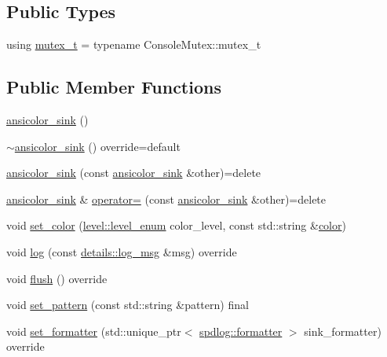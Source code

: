 \subsection*{Public Types}
\begin{DoxyCompactItemize}
\item 
using \hyperlink{classspdlog_1_1sinks_1_1ansicolor__sink_a99718be9a953edac6cae0371bc00fb2f}{mutex\+\_\+t} = typename Console\+Mutex\+::mutex\+\_\+t
\end{DoxyCompactItemize}
\subsection*{Public Member Functions}
\begin{DoxyCompactItemize}
\item 
\hyperlink{classspdlog_1_1sinks_1_1ansicolor__sink_aed8c41cc6f792b27bc37d2f46536268d}{ansicolor\+\_\+sink} ()
\item 
\hyperlink{classspdlog_1_1sinks_1_1ansicolor__sink_abca2e1439a310ff1a4d75044a5c718d1}{$\sim$ansicolor\+\_\+sink} () override=default
\item 
\hyperlink{classspdlog_1_1sinks_1_1ansicolor__sink_ab169c076bac30ee54cf369a7f6bfb2ea}{ansicolor\+\_\+sink} (const \hyperlink{classspdlog_1_1sinks_1_1ansicolor__sink}{ansicolor\+\_\+sink} \&other)=delete
\item 
\hyperlink{classspdlog_1_1sinks_1_1ansicolor__sink}{ansicolor\+\_\+sink} \& \hyperlink{classspdlog_1_1sinks_1_1ansicolor__sink_a7d2fcd5a2f9a3f02e64648a609a45fb1}{operator=} (const \hyperlink{classspdlog_1_1sinks_1_1ansicolor__sink}{ansicolor\+\_\+sink} \&other)=delete
\item 
void \hyperlink{classspdlog_1_1sinks_1_1ansicolor__sink_ad19df81408ed6dbbe62fe4a1e5a7fca8}{set\+\_\+color} (\hyperlink{namespacespdlog_1_1level_a35f5227e5daf228d28a207b7b2aefc8b}{level\+::level\+\_\+enum} color\+\_\+level, const std\+::string \&\hyperlink{color_8h_a80d1dc5f416b97f92939a4166d41203c}{color})
\item 
void \hyperlink{classspdlog_1_1sinks_1_1ansicolor__sink_a042a6ab886430570095737e1984e7c6e}{log} (const \hyperlink{structspdlog_1_1details_1_1log__msg}{details\+::log\+\_\+msg} \&msg) override
\item 
void \hyperlink{classspdlog_1_1sinks_1_1ansicolor__sink_a3c0587e868d2a42f96b878c6031333a0}{flush} () override
\item 
void \hyperlink{classspdlog_1_1sinks_1_1ansicolor__sink_ab84f8a9299e060e55dcfbe333806aedc}{set\+\_\+pattern} (const std\+::string \&pattern) final
\item 
void \hyperlink{classspdlog_1_1sinks_1_1ansicolor__sink_a030c3495398d4f320ad444ca940b4731}{set\+\_\+formatter} (std\+::unique\+\_\+ptr$<$ \hyperlink{classspdlog_1_1formatter}{spdlog\+::formatter} $>$ sink\+\_\+formatter) override
\end{DoxyCompactItemize}
